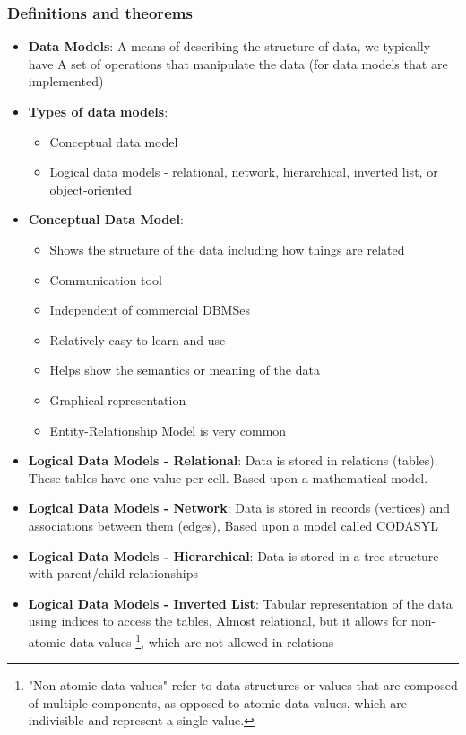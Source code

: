 \documentclass{report}
\begin{document}
    \subsubsection{Definitions and theorems}
    \begin{itemize}
        \item \textbf{Data Models}: A means of describing the structure of data, we typically have A set of operations that manipulate the data (for data models that are implemented)
        \item \textbf{Types of data models}:
            \begin{itemize}
                \item Conceptual data model
                \item  Logical data models - relational, network, hierarchical, inverted list, or object-oriented
            \end{itemize}
        \item \textbf{Conceptual Data Model}:
            \begin{itemize}
                \item Shows the structure of the data including how things are related
                \item Communication tool
                \item Independent of commercial DBMSes
                \item Relatively easy to learn and use
                \item Helps show the semantics or meaning of the data
                \item Graphical representation
                \item Entity-Relationship Model is very common
            \end{itemize}
        \item \textbf{Logical Data Models - Relational}: Data is stored in relations (tables). These tables have one value per cell. Based upon a mathematical model.
        \item \textbf{Logical Data Models - Network}: Data is stored in records (vertices) and associations between them (edges), Based upon a model called CODASYL
        \item \textbf{Logical Data Models - Hierarchical}: Data is stored in a tree structure with parent/child relationships
        \item \textbf{Logical Data Models - Inverted List}: Tabular representation of the data using indices to access the tables, Almost relational, but it allows for non-atomic data values \footnote{ "Non-atomic data values" refer to data structures or values that are composed of multiple components, as opposed to atomic data values, which are indivisible and represent a single value.}, which are not allowed in relations

\end{itemize}
\end{document}
